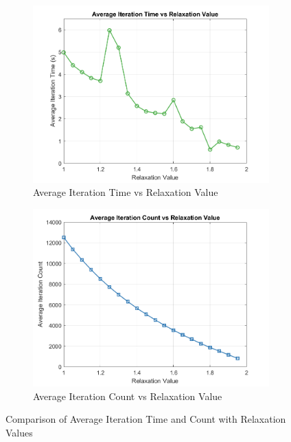 \begin{figure}[H]
    \centering
    \begin{subfigure}[b]{0.49\linewidth}
        \centering
        \includegraphics[width=\linewidth]{figures/overrelaxation/average_iteration_time_vs_relaxation_value.png}
        \caption{Average Iteration Time vs Relaxation Value}
        \label{fig:average_iteration_time}
    \end{subfigure}
    \hfill
    \begin{subfigure}[b]{0.49\linewidth}
        \centering
        \includegraphics[width=\linewidth]{figures/overrelaxation/average_iteration_count_vs_relaxation_value.png}
        \caption{Average Iteration Count vs Relaxation Value}
        \label{fig:average_iteration_count}
    \end{subfigure}
    \caption{Comparison of Average Iteration Time and Count with Relaxation Values}
    \label{fig:comparison}
\end{figure}

